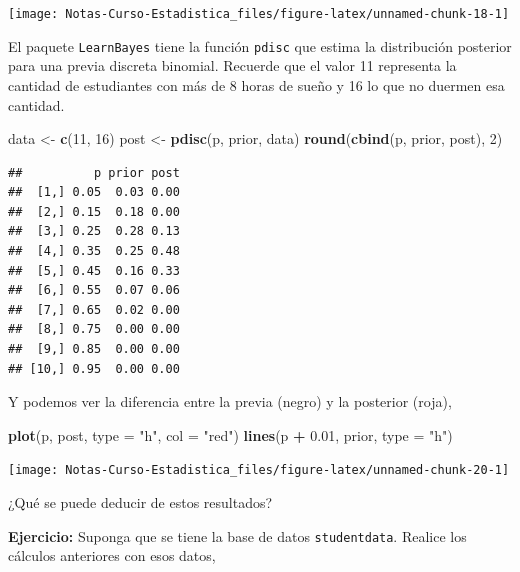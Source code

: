 \documentclass[
  12pt,
]{book}
\newenvironment{Shaded}{\begin{snugshade}}{\end{snugshade}}
\newcommand{\DataTypeTok}[1]{\textcolor[rgb]{0.13,0.29,0.53}{#1}}
\newcommand{\DecValTok}[1]{\textcolor[rgb]{0.00,0.00,0.81}{#1}}
\newcommand{\FloatTok}[1]{\textcolor[rgb]{0.00,0.00,0.81}{#1}}
\newcommand{\KeywordTok}[1]{\textcolor[rgb]{0.13,0.29,0.53}{\textbf{#1}}}
\newcommand{\NormalTok}[1]{#1}
\newcommand{\OperatorTok}[1]{\textcolor[rgb]{0.81,0.36,0.00}{\textbf{#1}}}
\newcommand{\StringTok}[1]{\textcolor[rgb]{0.31,0.60,0.02}{#1}}
\begin{document}
\begin{center}\texttt{[image: Notas-Curso-Estadistica\_files/figure-latex/unnamed-chunk-18-1]} \end{center}

El paquete \texttt{LearnBayes} tiene la función \texttt{pdisc} que estima la distribución posterior para una previa discreta binomial. Recuerde que el valor 11 representa la cantidad de estudiantes con más de 8 horas de sueño y 16 lo que no duermen esa cantidad.

\begin{Shaded}
\begin{Highlighting}[]
\NormalTok{data \textless{}{-}}\StringTok{ }\KeywordTok{c}\NormalTok{(}\DecValTok{11}\NormalTok{, }\DecValTok{16}\NormalTok{)}
\NormalTok{post \textless{}{-}}\StringTok{ }\KeywordTok{pdisc}\NormalTok{(p, prior, data)}
\KeywordTok{round}\NormalTok{(}\KeywordTok{cbind}\NormalTok{(p, prior, post), }\DecValTok{2}\NormalTok{)}
\end{Highlighting}
\end{Shaded}

\begin{verbatim}
##          p prior post
##  [1,] 0.05  0.03 0.00
##  [2,] 0.15  0.18 0.00
##  [3,] 0.25  0.28 0.13
##  [4,] 0.35  0.25 0.48
##  [5,] 0.45  0.16 0.33
##  [6,] 0.55  0.07 0.06
##  [7,] 0.65  0.02 0.00
##  [8,] 0.75  0.00 0.00
##  [9,] 0.85  0.00 0.00
## [10,] 0.95  0.00 0.00
\end{verbatim}

Y podemos ver la diferencia entre la previa (negro) y la posterior (roja),

\begin{Shaded}
\begin{Highlighting}[]
\KeywordTok{plot}\NormalTok{(p, post, }\DataTypeTok{type =} \StringTok{"h"}\NormalTok{, }\DataTypeTok{col =} \StringTok{"red"}\NormalTok{)}
\KeywordTok{lines}\NormalTok{(p }\OperatorTok{+}\StringTok{ }\FloatTok{0.01}\NormalTok{, prior, }\DataTypeTok{type =} \StringTok{"h"}\NormalTok{)}
\end{Highlighting}
\end{Shaded}

\begin{center}\texttt{[image: Notas-Curso-Estadistica\_files/figure-latex/unnamed-chunk-20-1]} \end{center}

¿Qué se puede deducir de estos resultados?

\textbf{Ejercicio:} Suponga que se tiene la base de datos \texttt{studentdata}. Realice los cálculos anteriores con esos datos,
\end{document}
